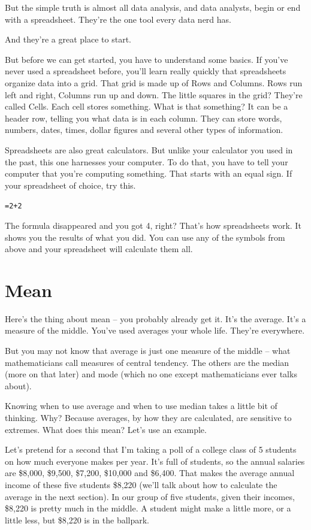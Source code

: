 \documentclass[]{book}
\begin{document}
But the simple truth is almost all data analysis, and data analysts, begin or end with a spreadsheet. They're the one tool every data nerd has.

And they're a great place to start.

But before we can get started, you have to understand some basics. If you've never used a spreadsheet before, you'll learn really quickly that spreadsheets organize data into a grid. That grid is made up of Rows and Columns. Rows run left and right, Columns run up and down. The little squares in the grid? They're called Cells. Each cell stores something. What is that something? It can be a header row, telling you what data is in each column. They can store words, numbers, dates, times, dollar figures and several other types of information.

Spreadsheets are also great calculators. But unlike your calculator you used in the past, this one harnesses your computer. To do that, you have to tell your computer that you're computing something. That starts with an equal sign. If your spreadsheet of choice, try this.

\texttt{=2+2}

The formula disappeared and you got 4, right? That's how spreadsheets work. It shows you the results of what you did. You can use any of the symbols from above and your spreadsheet will calculate them all.

\hypertarget{mean}{%
\chapter{Mean}\label{mean}}

Here's the thing about mean -- you probably already get it. It's the average. It's a measure of the middle. You've used averages your whole life. They're everywhere.

But you may not know that average is just one measure of the middle -- what mathematicians call measures of central tendency. The others are the median (more on that later) and mode (which no one except mathematicians ever talks about).

Knowing when to use average and when to use median takes a little bit of thinking. Why? Because averages, by how they are calculated, are sensitive to extremes. What does this mean? Let's use an example.

Let's pretend for a second that I'm taking a poll of a college class of 5 students on how much everyone makes per year. It's full of students, so the annual salaries are \$8,000, \$9,500, \$7,200, \$10,000 and \$6,400. That makes the average annual income of these five students \$8,220 (we'll talk about how to calculate the average in the next section). In our group of five students, given their incomes, \$8,220 is pretty much in the middle. A student might make a little more, or a little less, but \$8,220 is in the ballpark.
\end{document}
